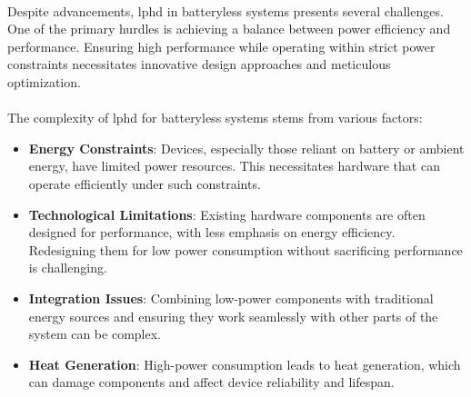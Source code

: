         \paragraph{}
        Despite advancements, \gls{lphd} in batteryless systems presents several challenges. One of the primary hurdles is achieving a balance between power efficiency and performance. Ensuring high performance while operating within strict power constraints necessitates innovative design approaches and meticulous optimization.

        \paragraph{}
        The complexity of \gls{lphd} for batteryless systems stems from various factors:
        \begin{itemize}
            \item \textbf{Energy Constraints}: Devices, especially those reliant on battery or ambient energy, have limited power resources. This necessitates hardware that can operate efficiently under such constraints.
            \item \textbf{Technological Limitations}: Existing hardware components are often designed for performance, with less emphasis on energy efficiency. Redesigning them for low power consumption without sacrificing performance is challenging.
            \item \textbf{Integration Issues}: Combining low-power components with traditional energy sources and ensuring they work seamlessly with other parts of the system can be complex.
            \item \textbf{Heat Generation}: High-power consumption leads to heat generation, which can damage components and affect device reliability and lifespan.
        \end{itemize}

